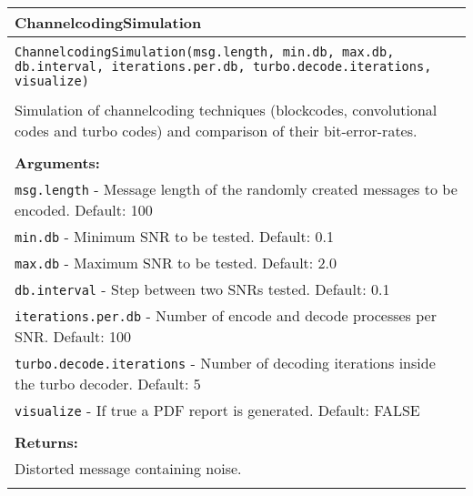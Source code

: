 \begin{longtable}{|p{\textwidth}|}
\hline
\rowcolor{lightblue}ChannelcodingSimulation\\
\hline
\\
\texttt{ChannelcodingSimulation(msg.length, min.db, max.db, db.interval, iterations.per.db, turbo.decode.iterations, visualize)}\\
\\
Simulation of channelcoding techniques (blockcodes, convolutional codes and turbo codes) and comparison of their bit-error-rates.\\
\\
\textbf{Arguments:}\\
\texttt{msg.length} - Message length of the randomly created messages to be encoded. Default: 100\\
\texttt{min.db} - Minimum SNR to be tested. Default: 0.1\\
\texttt{max.db} - Maximum SNR to be tested. Default: 2.0\\
\texttt{db.interval} - Step between two SNRs tested. Default: 0.1\\
\texttt{iterations.per.db} - Number of encode and decode processes per SNR. Default: 100\\
\texttt{turbo.decode.iterations} - Number of decoding iterations inside the turbo decoder. Default: 5\\
\texttt{visualize} - If true a PDF report is generated. Default: FALSE\\
\\
\textbf{Returns:}\\
Distorted message containing noise.\\
\\
\hline
\end{longtable}